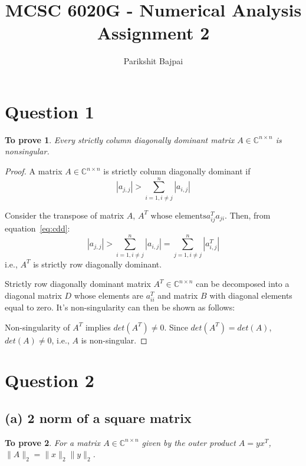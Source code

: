 \documentclass[11pt, oneside]{article}
\title{MCSC 6020G - Numerical Analysis \\
        \Large Assignment 2}
\author{Parikshit Bajpai}
\date{}
\newtheorem*{remark}{To prove}
\begin{document}
\maketitle

\section*{Question 1}
	\begin{remark}
		Every strictly column diagonally dominant matrix $A \in \mathbb{C}^{n \times n}$ is nonsingular. 
	\end{remark}
	\begin{proof}
		A matrix $A \in \mathbb{C}^{n \times n}$ is strictly column diagonally dominant if 
		\begin{equation}\label{eq:cdd}
			|a_{j,j}| > \sum_{i=1, i\neq j}^n |a_{i,j}|
		\end{equation}
		
		Consider the transpose of matrix $A$, $A^T \text{ whose elements} a^T_{ij} a_{ji}$. Then, from equation~\eqref{eq:cdd}:
		\begin{equation}\label{eq:cdd}
			|a_{j,j}| >  \sum_{i=1, i\neq j}^n |a_{i,j}| = \sum_{j=1, i\neq j}^n |a^T_{i,j}|
		\end{equation}
		i.e., $A^T$ is strictly row diagonally dominant.  
		
		Strictly row diagonally dominant matrix $A^T \in \mathbb{C}^{n \times n}$ can be decomposed into a diagonal matrix $D$ whose elements are $a^T_{ii}$ and matrix $B$ with diagonal elements equal to zero. It's non-singularity can then be shown as follows:
		 
		Non-singularity of $A^T$ implies $det(A^T) \neq 0$. Since $det(A^T) = det(A)$, $det(A) \neq 0$, i.e., $A$ is non-singular. 	
	\end{proof}

\section*{Question 2}
\subsection*{(a) 2 norm of a square matrix}
  	\begin{remark}
    		For a matrix $A \in \mathbb{C}^{n \times n}$ given by the outer product $A = y x^T$, $\|A\|_2 = \|x\|_2 \|y\|_2$.
  	\end{remark}
	
\end{document}
